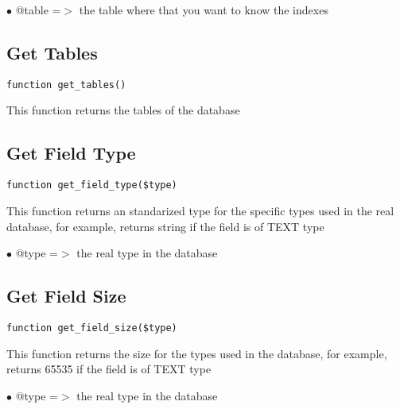 \documentclass[a4paper]{book}
\begin{document}
\begin{compactitem}
\item[\color{myblue}$\bullet$] @table =$>$ the table where that you want to know the indexes
\end{compactitem}

\hypertarget{toc233}{}
\subsection{Get Tables}

\begin{lstlisting}
function get_tables()
\end{lstlisting}

This function returns the tables of the database

\hypertarget{toc234}{}
\subsection{Get Field Type}

\begin{lstlisting}
function get_field_type($type)
\end{lstlisting}

This function returns an standarized type for the specific types used in
the real database, for example, returns string if the field is of TEXT type

\begin{compactitem}
\item[\color{myblue}$\bullet$] @type =$>$ the real type in the database
\end{compactitem}

\hypertarget{toc235}{}
\subsection{Get Field Size}

\begin{lstlisting}
function get_field_size($type)
\end{lstlisting}

This function returns the size for the types used in the database, for
example, returns 65535 if the field is of TEXT type

\begin{compactitem}
\item[\color{myblue}$\bullet$] @type =$>$ the real type in the database
\end{compactitem}

\hypertarget{toc236}{}
\end{document}
